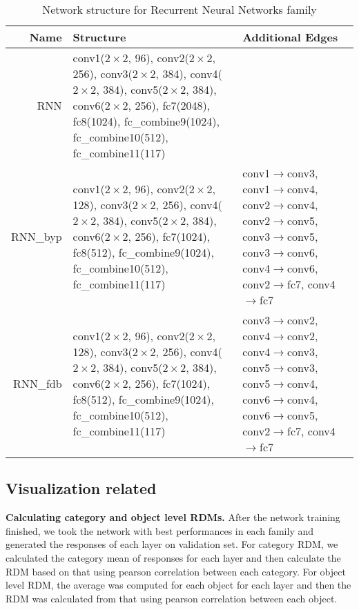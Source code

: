\begin{table}[h]
\caption{Network structure for Recurrent Neural Networks family} %
\centering %
\begin{tabularx}{\textwidth}{r|X|X}
\hline\hline
Name & Structure & Additional Edges\\ [0.5ex]
\hline
RNN & conv1($2\times2$, 96), conv2($2\times2$, 256), conv3($2\times2$, 384), conv4($2\times2$, 384), conv5($2\times2$, 384), conv6($2\times2$, 256), fc7(2048), fc8(1024), fc\_combine9(1024), fc\_combine10(512), fc\_combine11(117) & \\
\hline
RNN\_byp & conv1($2\times2$, 96), conv2($2\times2$, 128), conv3($2\times2$, 256), conv4($2\times2$, 384), conv5($2\times2$, 384), conv6($2\times2$, 256), fc7(1024), fc8(512), fc\_combine9(1024), fc\_combine10(512), fc\_combine11(117) & conv1$\rightarrow$conv3, conv1$\rightarrow$conv4, conv2$\rightarrow$conv4, conv2$\rightarrow$conv5, conv3$\rightarrow$conv5, conv3$\rightarrow$conv6, conv4$\rightarrow$conv6, conv2$\rightarrow$fc7, conv4$\rightarrow$fc7\\
\hline
RNN\_fdb & conv1($2\times2$, 96), conv2($2\times2$, 128), conv3($2\times2$, 256), conv4($2\times2$, 384), conv5($2\times2$, 384), conv6($2\times2$, 256), fc7(1024), fc8(512), fc\_combine9(1024), fc\_combine10(512), fc\_combine11(117) & conv3$\rightarrow$conv2, conv4$\rightarrow$conv2, conv4$\rightarrow$conv3, conv5$\rightarrow$conv3, conv5$\rightarrow$conv4, conv6$\rightarrow$conv4, conv6$\rightarrow$conv5, conv2$\rightarrow$fc7, conv4$\rightarrow$fc7\\
\hline
\end{tabularx}
\label{tab:struct_rnn}
\end{table}

\subsection{Visualization related}
\label{sec:visual}

\textbf{Calculating category and object level RDMs.} After the network training finished, we took the network with best performances in each family and generated the responses of each layer on validation set. 
For category RDM, we calculated the category mean of responses for each layer and then calculate the RDM based on that using pearson correlation between each category.
For object level RDM, the average was computed for each object for each layer and then the RDM was calculated from that using pearson correlation between each object.

